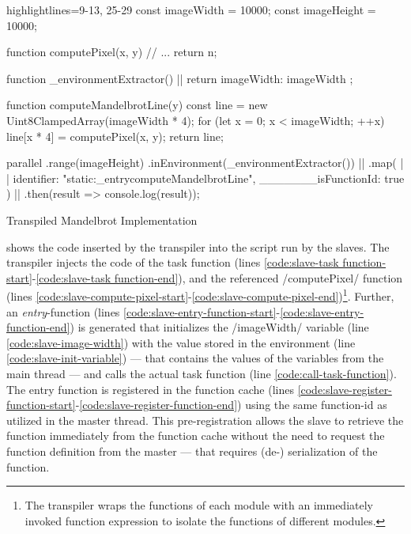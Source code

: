 \begin{listing}
	\begin{javascriptcode*}{highlightlines={9-13, 25-29}}
const imageWidth = 10000;
const imageHeight = 10000;

function computePixel(x, y) {
	// ...
	return n;
}

function _environmentExtractor() { |$\label{code:mandelbrot-environment-extractor}$|
	return {
		imageWidth: imageWidth
	};
}

function computeMandelbrotLine(y) {
	const line = new Uint8ClampedArray(imageWidth * 4);
	for (let x = 0; x < imageWidth; ++x) {
		line[x * 4] = computePixel(x, y);
	}
	return line;
}

parallel
	.range(imageHeight)
	.inEnvironment(_environmentExtractor()) |$\label{code:mandelbrot-environment-call}$|
	.map({ |$\label{code:mandelbrot-function-id-start}$|
		identifier: "static:_entrycomputeMandelbrotLine",
		_______isFunctionId: true
	}) |$\label{code:mandelbrot-function-id-end}$|
	.then(result => console.log(result));
\end{javascriptcode*}
\caption{Transpiled Mandelbrot Implementation}
\label{fig:mandelbrot-transpiled}
\end{listing}


 shows the code inserted by the transpiler into the script run by the slaves. The transpiler injects the code of the task function (lines \ref{code:slave-task function-start}-\ref{code:slave-task function-end}), and the referenced \javascriptinline/computePixel/ function (lines \ref{code:slave-compute-pixel-start}-\ref{code:slave-compute-pixel-end})\footnote{The transpiler wraps the functions of each module with an immediately invoked function expression to isolate the functions of different modules.}. Further, an \textit{entry}-function (lines \ref{code:slave-entry-function-start}-\ref{code:slave-entry-function-end}) is generated that initializes the \javascriptinline/imageWidth/ variable (line \ref{code:slave-image-width}) with the value stored in the environment (line \ref{code:slave-init-variable}) --- that contains the values of the variables from the main thread --- and calls the actual task function (line \ref{code:call-task-function}). The entry function is registered in the function cache (lines \ref{code:slave-register-function-start}-\ref{code:slave-register-function-end}) using the same function-id as utilized in the master thread. This pre-registration allows the slave to retrieve the function immediately from the function cache without the need to request the function definition from the master --- that requires (de-) serialization of the function.

